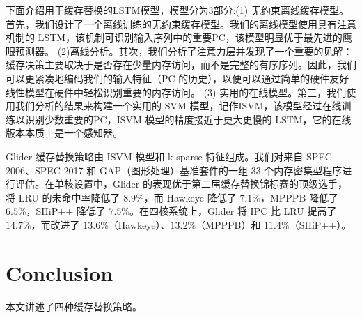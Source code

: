 \documentclass[10pt,journal,compsoc]{IEEEtran}
\begin{document}
下面介绍用于缓存替换的LSTM模型，模型分为3部分:(1) 无约束离线缓存模型。首先，我们设计了一个离线训练的无约束缓存模型。我们的离线模型使用具有注意机制的 LSTM，该机制可识别输入序列中的重要PC，该模型明显优于最先进的鹰眼预测器。 (2)离线分析。其次，我们分析了注意力层并发现了一个重要的见解：缓存决策主要取决于是否存在少量内存访问，而不是完整的有序序列。因此，我们可以更紧凑地编码我们的输入特征（PC 的历史），以便可以通过简单的硬件友好线性模型在硬件中轻松识别重要的内存访问。 (3) 实用的在线模型。第三，我们使用我们分析的结果来构建一个实用的 SVM 模型，记作ISVM，该模型经过在线训练以识别少数重要的PC，ISVM 模型的精度接近于更大更慢的 LSTM，它的在线版本本质上是一个感知器。

Glider 缓存替换策略由 ISVM 模型和 k-sparse 特征组成\cite{shi2019applying}。我们对来自 SPEC 2006、SPEC 2017 和 GAP（图形处理）基准套件的一组 33 个内存密集型程序进行评估。在单核设置中，Glider 的表现优于第二届缓存替换锦标赛的顶级选手，将 LRU 的未命中率降低了 $8.9\%$，而 Hawkeye 降低了 $7.1\%$，MPPPB 降低了 $6.5\%$，SHiP++ 降低了 $7.5\%$。在四核系统上，Glider 将 IPC 比 LRU 提高了 $14.7\%$，而改进了 $13.6\%$（Hawkeye）、$13.2\%$（MPPPB）和 $11.4\%$（SHiP++）。





\section{Conclusion}

本文讲述了四种缓存替换策略。
\end{document}
